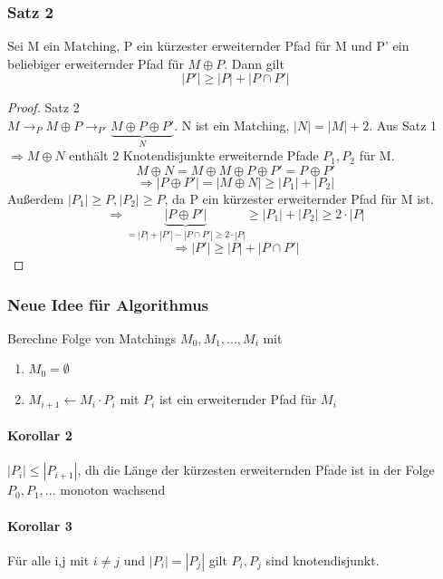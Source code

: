 \subsubsection{Satz 2}
Sei M ein Matching, P ein kürzester erweiternder Pfad für M und P' ein beliebiger erweiternder Pfad für $ M \oplus P $. Dann gilt 
$$ |P'| \geq |P| + |P \cap P'| $$


\begin{proof} Satz 2 \\
$ M \rightarrow_P M \oplus P \rightarrow_{P'} \underbrace{M \oplus P \oplus P'}_N $. N ist ein Matching, $|N| = |M| + 2$. Aus Satz 1 $ \Rightarrow M \oplus N $ enthält 2 Knotendisjunkte erweiternde Pfade $ P_1,P_2 $ für M. 
$$ M \oplus N = M \oplus M \oplus P \oplus P' = P \oplus P ' $$
$$ \Rightarrow |P \oplus P'| = |M \oplus N | \geq |P_1| + |P_2| $$
Außerdem $ |P_1| \geq P, |P_2| \geq P $, da P ein kürzester erweiternder Pfad für M ist.
$$ \Rightarrow \underbrace{|P \oplus P'|}_{= |P| + |P'| - |P \cap P'| \geq 2 \cdot |P| } \geq |P_1| + |P_2| \geq 2 \cdot |P| $$
$$ \Rightarrow |P'| \geq |P| + |P \cap P'| $$

\end{proof}
 
\subsubsection{Neue Idee für Algorithmus} Berechne Folge von Matchings $ M_0, M_1,..., M_i $ mit 
\begin{enumerate}
    \item $ M_0 = \emptyset $
    \item $ M_{i+1} \gets M_i \cdot P_i $ mit $P_i$ ist ein erweiternder Pfad für $ M_i $
\end{enumerate}

\paragraph{Korollar 2} $ |P_i| \leq |P_{i + 1}| $, dh die Länge der kürzesten erweiternden Pfade ist in der Folge $ P_0,P_1,... $ monoton wachsend

\paragraph{Korollar 3} Für alle i,j mit $ i \neq j $ und $ |P_i| = |P_j| $ gilt $ P_i, P_j $ sind knotendisjunkt.









 
